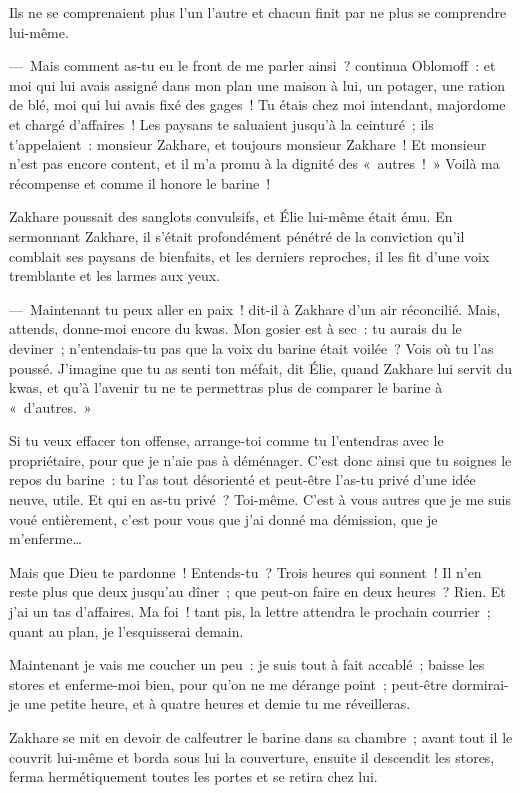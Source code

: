 \documentclass[french,twoside]{book} %
\begin{document}
Ils ne se comprenaient plus l’un l’autre et chacun finit par ne plus se comprendre lui-même.\par
— Mais comment as-tu eu le front de me parler ainsi ? continua Oblomoff : et moi qui lui avais assigné dans mon plan une maison à lui, un potager, une ration de blé, moi qui lui avais fixé des gages ! Tu étais chez moi intendant, majordome et chargé d’affaires ! Les paysans te saluaient jusqu’à la ceinturé ; ils t’appelaient : monsieur Zakhare, et toujours monsieur Zakhare ! Et monsieur n’est pas encore content, et il m’a promu à la dignité des « autres ! » Voilà ma récompense et comme il honore le barine !\par
Zakhare poussait des sanglots convulsifs, et Élie lui-même était ému. En sermonnant Zakhare, il s’était profondément pénétré de la conviction qu’il comblait ses paysans de bienfaits, et les derniers reproches, il les fit d’une voix tremblante et les larmes aux yeux.\par
— Maintenant tu peux aller en paix ! dit-il à Zakhare d’un air réconcilié. Mais, attends, donne-moi encore du kwas. Mon gosier est à sec : tu aurais du le deviner ; n’entendais-tu pas que la voix du barine était voilée ? Vois où tu l’as poussé. J’imagine que tu as senti ton méfait, dit Élie, quand Zakhare lui servit du kwas, et qu’à l’avenir tu ne te permettras plus de comparer le barine à « d’autres. »\par
Si tu veux effacer ton offense, arrange-toi comme tu l’entendras avec le propriétaire, pour que je n’aie pas à déménager. C’est donc ainsi que tu soignes le repos du barine : tu l’as tout désorienté et peut-être l’as-tu privé d’une idée neuve, utile. Et qui en as-tu privé ? Toi-même. C’est à vous autres que je me suis voué entièrement, c’est pour vous que j’ai donné ma démission, que je m’enferme…\par
Mais que Dieu te pardonne ! Entends-tu ? Trois heures qui sonnent ! Il n’en reste plus que deux jusqu’au dîner ; que peut-on faire en deux heures ? Rien. Et j’ai un tas d’affaires. Ma foi ! tant pis, la lettre attendra le prochain courrier ; quant au plan, je l’esquisserai demain.\par
Maintenant je vais me coucher un peu : je suis tout à fait accablé ; baisse les stores et enferme-moi bien, pour qu’on ne me dérange point ; peut-être dormirai-je une petite heure, et à quatre heures et demie tu me réveilleras.\par
Zakhare se mit en devoir de calfeutrer le barine dans sa chambre ; avant tout il le couvrit lui-même et borda sous lui la couverture, ensuite il descendit les stores, ferma hermétiquement toutes les portes et se retira chez lui.\par
\end{document}
